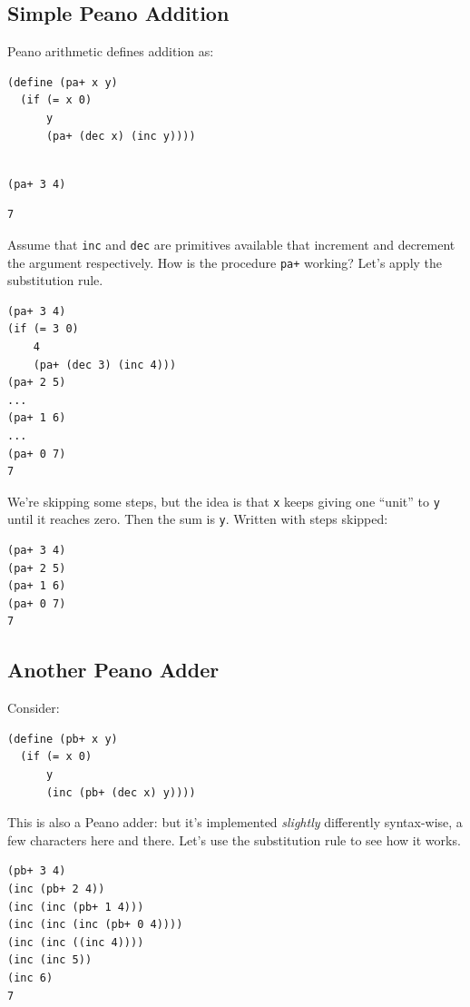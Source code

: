\documentclass[9pt]{report}
\begin{document}
\subsection{Simple Peano Addition}
\label{sec:org793c588}
Peano arithmetic defines addition as:

\begin{verbatim}
(define (pa+ x y)
  (if (= x 0)
      y
      (pa+ (dec x) (inc y))))
\end{verbatim}

\begin{verbatim}

(pa+ 3 4)
\end{verbatim}

\begin{verbatim}
7
\end{verbatim}


Assume that \texttt{inc} and \texttt{dec} are primitives available that increment
and decrement the argument respectively. How is the procedure \texttt{pa+}
working? Let's apply the substitution rule.

\begin{verbatim}
(pa+ 3 4)
(if (= 3 0)
    4
    (pa+ (dec 3) (inc 4)))
(pa+ 2 5)
...
(pa+ 1 6)
...
(pa+ 0 7)
7
\end{verbatim}

We're skipping some steps, but the idea is that \texttt{x} keeps giving
one ``unit'' to \texttt{y} until it reaches zero. Then the sum is \texttt{y}.
Written with steps skipped:

\begin{verbatim}
(pa+ 3 4)
(pa+ 2 5)
(pa+ 1 6)
(pa+ 0 7)
7
\end{verbatim}

\subsection{Another Peano Adder}
\label{sec:org8f8aef5}
Consider:
\begin{verbatim}
(define (pb+ x y)
  (if (= x 0)
      y
      (inc (pb+ (dec x) y))))
\end{verbatim}


This is also a Peano adder: but it's implemented \emph{slightly}
differently syntax-wise, a few characters here and there. Let's
use the substitution rule to see how it works.

\begin{verbatim}
(pb+ 3 4)
(inc (pb+ 2 4))
(inc (inc (pb+ 1 4)))
(inc (inc (inc (pb+ 0 4))))
(inc (inc ((inc 4))))
(inc (inc 5))
(inc 6)
7
\end{verbatim}
\end{document}
